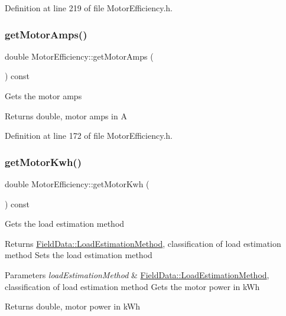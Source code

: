 Definition at line 219 of file Motor\+Efficiency.\+h.

\mbox{\label{class_motor_efficiency_a955906509a4b49274b35c1b119c4a4b4}} 
\subsubsection{\texorpdfstring{get\+Motor\+Amps()}{getMotorAmps()}}
{\footnotesize\ttfamily double Motor\+Efficiency\+::get\+Motor\+Amps (\begin{DoxyParamCaption}{ }\end{DoxyParamCaption}) const\hspace{0.3cm}{\ttfamily [inline]}}

Gets the motor amps

\begin{DoxyReturn}{Returns}
double, motor amps in A 
\end{DoxyReturn}


Definition at line 172 of file Motor\+Efficiency.\+h.

\mbox{\label{class_motor_efficiency_a4d21d0c44ee00f5d097b0acbcb73a8d8}} 
\subsubsection{\texorpdfstring{get\+Motor\+Kwh()}{getMotorKwh()}}
{\footnotesize\ttfamily double Motor\+Efficiency\+::get\+Motor\+Kwh (\begin{DoxyParamCaption}{ }\end{DoxyParamCaption}) const\hspace{0.3cm}{\ttfamily [inline]}}

Gets the load estimation method

\begin{DoxyReturn}{Returns}
\hyperlink{class_field_data_a424e89914ba5684c01bb269dbe3312fd}{Field\+Data\+::\+Load\+Estimation\+Method}, classification of load estimation method Sets the load estimation method
\end{DoxyReturn}

\begin{DoxyParams}{Parameters}
{\em load\+Estimation\+Method} & \hyperlink{class_field_data_a424e89914ba5684c01bb269dbe3312fd}{Field\+Data\+::\+Load\+Estimation\+Method}, classification of load estimation method Gets the motor power in k\+Wh\\
\hline
\end{DoxyParams}
\begin{DoxyReturn}{Returns}
double, motor power in k\+Wh 
\end{DoxyReturn}



